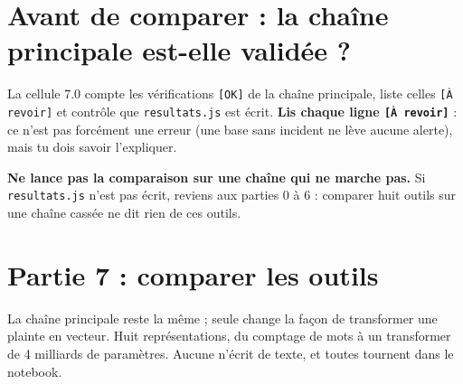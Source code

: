 
\section{Avant de comparer : la chaîne principale est-elle validée ?}

\begin{stepbox}[title={7.0\quad Le bilan de la chaîne principale}]
La cellule 7.0 compte les vérifications \texttt{[OK]} de la chaîne principale, liste celles \texttt{[À revoir]}
et contrôle que \texttt{resultats.js} est écrit. \textbf{Lis chaque ligne \texttt{[À revoir]}} : ce n'est pas
forcément une erreur (une base sans incident ne lève aucune alerte), mais tu dois savoir l'expliquer.
\end{stepbox}

\begin{piege}
\textbf{Ne lance pas la comparaison sur une chaîne qui ne marche pas.} Si \texttt{resultats.js} n'est pas
écrit, reviens aux parties 0 à 6 : comparer huit outils sur une chaîne cassée ne dit rien de ces outils.
\end{piege}

\section{Partie 7 : comparer les outils}

La chaîne principale reste la même ; seule change la façon de transformer une plainte en vecteur.
Huit représentations, du comptage de mots à un transformer de 4 milliards de paramètres. Aucune
n'écrit de texte, et toutes tournent dans le notebook.

